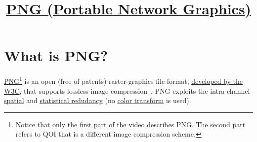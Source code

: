 \title{\href{http://www.libpng.org/pub/png}{PNG (Portable
  Network Graphics)}}

\maketitle
\tableofcontents

\section{What is PNG?}
\href{https://www.youtube.com/watch?v=EFUYNoFRHQI}{PNG}\footnote{Notice
that only the first part of the video describes PNG. The second part
refers to QOI that is a different image compression scheme.} is an
open (free of patents) raster-graphics file format,
\href{https://en.wikipedia.org/wiki/Portable_Network_Graphics}{developed
  by the W3C}, that supports lossless image
compression~\cite{roelofs1999png}. PNG exploits the intra-channel
\href{https://en.wikipedia.org/wiki/Image_compression}{spatial} and
\href{https://en.wikipedia.org/wiki/Data_compression}{statistical
  redudancy} (no \href{https://en.wikipedia.org/wiki/YUV}{color
  transform} is used).

